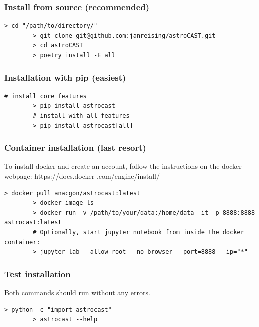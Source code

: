 \documentclass[utf8]{FrontiersinHarvard}
\begin{document}
    \subsubsection{Install from source (recommended)}
    \label{res:install-from-source}
    \begin{lstlisting}[style=bashStyle]
        > cd "/path/to/directory/"
        > git clone git@github.com:janreising/astroCAST.git
        > cd astroCAST
        > poetry install -E all
    \end{lstlisting}

    \subsubsection{Installation with pip (easiest)}
    \begin{lstlisting}[style=bashStyle]
        # install core features
        > pip install astrocast
        # install with all features
        > pip install astrocast[all]
    \end{lstlisting}

    \subsubsection{Container installation (last resort)}

    To install docker and create an account, follow the instructions on the docker webpage: https://docs.docker
    .com/engine/install/

    \begin{lstlisting}[style=bashStyle]
        > docker pull anacgon/astrocast:latest
        > docker image ls
        > docker run -v /path/to/your/data:/home/data -it -p 8888:8888 astrocast:latest
        # Optionally, start jupyter notebook from inside the docker container:
        > jupyter-lab --allow-root --no-browser --port=8888 --ip="*"
    \end{lstlisting}

    \subsubsection{Test installation}

    Both commands should run without any errors.

    \begin{lstlisting}[style=bashStyle]
        > python -c "import astrocast"
        > astrocast --help
    \end{lstlisting}
\end{document}
